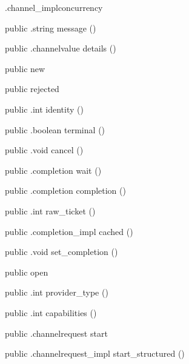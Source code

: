 \begin{CrexxClass}{.channel\_impl}{concurrency}
\begin{Members}
    \Method
      {public}
      {.string}
      {message}
      {()}

    \Method
      {public}
      {.channelvalue}
      {details}
      {()}

    \Factory
      {public}
      {new}
      {}

    \Factory
      {public}
      {rejected}
      {}

    \Method
      {public}
      {.int}
      {identity}
      {()}

    \Method
      {public}
      {.boolean}
      {terminal}
      {()}

    \Method
      {public}
      {.void}
      {cancel}
      {()}

    \Method
      {public}
      {.completion}
      {wait}
      {()}

    \Method
      {public}
      {.completion}
      {completion}
      {()}

    \Method
      {public}
      {.int}
      {raw\_ticket}
      {()}

    \Method
      {public}
      {.completion\_impl}
      {cached}
      {()}

    \Method
      {public}
      {.void}
      {set\_completion}
      {()}

    \Factory
      {public}
      {open}
      {}

    \Method
      {public}
      {.int}
      {provider\_type}
      {()}

    \Method
      {public}
      {.int}
      {capabilities}
      {()}

    \Method
      {public}
      {.channelrequest}
      {start}
      {}

    \Method
      {public}
      {.channelrequest\_impl}
      {start\_structured}
      {()}


\end{Members}
\end{CrexxClass}
